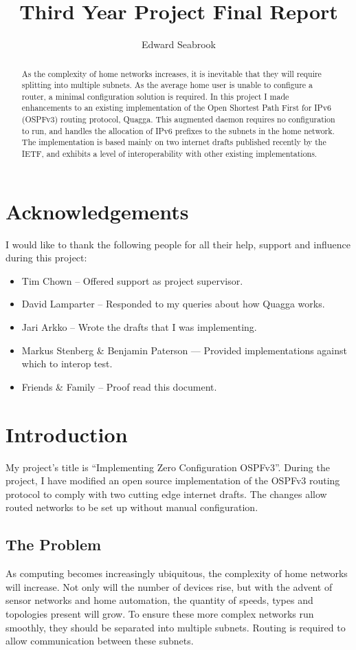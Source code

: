 \documentclass[12pt,a4paper,twoside]{report}
\author{Edward Seabrook}
\title{Third Year Project Final Report}
\begin{document}


\begin{abstract}
As the complexity of home networks increases, it is inevitable that they will
require splitting into multiple subnets. As the average home user is unable to
configure a router, a minimal configuration solution is required. In this
project I made enhancements to an existing implementation of the Open Shortest
Path First for IPv6 (OSPFv3) routing protocol, Quagga. This augmented daemon
requires no configuration to run, and handles the allocation of IPv6 prefixes
to the subnets in the home network. The implementation is based mainly on two
internet drafts published recently by the IETF\@{}, and exhibits a level of interoperability with other
existing implementations. 
\end{abstract}

\tableofcontents
\clearpage

\chapter*{Acknowledgements}
I would like to thank the following people for all their help, support and
influence during this project:
\begin{itemize}
\item Tim Chown -- Offered support as project supervisor.
\item David Lamparter -- Responded to my queries about how Quagga works.
\item Jari Arkko -- Wrote the drafts that I was implementing.
\item Markus Stenberg \& Benjamin Paterson --- Provided implementations against which
      to interop test.
\item Friends \& Family -- Proof read this document.
\end{itemize}

\chapter{Introduction}
My project's title is ``Implementing Zero Configuration OSPFv3''. During the
project, I have modified an open source implementation of the OSPFv3 routing
protocol to comply with two cutting edge internet drafts. The changes allow
routed networks to be set up without manual configuration.

\section{The Problem}
As computing becomes increasingly ubiquitous, the complexity of home networks
will increase. Not only will the number of devices rise, but with the advent of
sensor networks and home automation, the quantity of speeds, types and
topologies present will grow. To ensure these more complex networks run
smoothly, they should be separated into multiple subnets. Routing is required
to allow communication between these subnets. 
\end{document}
